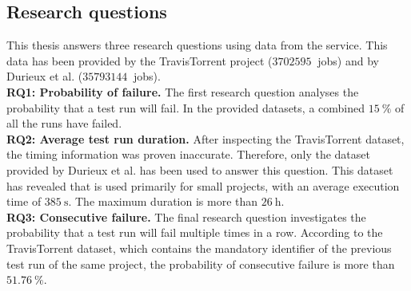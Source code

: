 \subsection{Research questions}
\noindent This thesis answers three research questions using data from the \travisci{} service. This data has been provided by the TravisTorrent project \cite{msr17challenge} ($\SI{3702595}{}$ jobs) and by Durieux et al. \cite{travisanalysis} ($\SI{35793144}{}$ jobs).\\

\noindent \textbf{RQ1: Probability of failure.}
The first research question analyses the probability that a test run will fail. In the provided datasets, a combined $\SI{15}{\percent}$ of all the runs have failed.\\

\noindent \textbf{RQ2: Average test run duration.}
After inspecting the TravisTorrent dataset, the timing information was proven inaccurate. Therefore, only the dataset provided by Durieux et al. has been used to answer this question. This dataset has revealed that \travisci{} is used primarily for small projects, with an average execution time of $\SI{385}{\second}$. The maximum duration is more than $\SI{26}{\hour}$.\\

\noindent \textbf{RQ3: Consecutive failure.}
The final research question investigates the probability that a test run will fail multiple times in a row. According to the TravisTorrent dataset, which contains the mandatory identifier of the previous test run of the same project, the probability of consecutive failure is more than $\SI{51.76}{\percent}$.